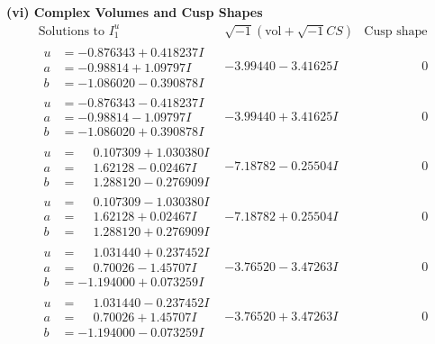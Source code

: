 \documentclass[1p]{elsarticle_modified}
\theoremstyle{definition}
\newcommand{\I}{\sqrt{-1}}
\begin{document}
\newpage\flushleft \textbf{(vi) Complex Volumes and Cusp Shapes}
$$\begin{array}{c|c|c}  
\text{Solutions to }I^u_{1}& \I (\text{vol} + \sqrt{-1}CS) & \text{Cusp shape}\\
 \hline 
\begin{aligned}
u &= -0.876343 + 0.418237 I \\
a &= -0.98814 + 1.09797 I \\
b &= -1.086020 - 0.390878 I\end{aligned}
 & -3.99440 - 3.41625 I & \phantom{-0.000000 } 0 \\ \hline\begin{aligned}
u &= -0.876343 - 0.418237 I \\
a &= -0.98814 - 1.09797 I \\
b &= -1.086020 + 0.390878 I\end{aligned}
 & -3.99440 + 3.41625 I & \phantom{-0.000000 } 0 \\ \hline\begin{aligned}
u &= \phantom{-}0.107309 + 1.030380 I \\
a &= \phantom{-}1.62128 - 0.02467 I \\
b &= \phantom{-}1.288120 - 0.276909 I\end{aligned}
 & -7.18782 - 0.25504 I & \phantom{-0.000000 } 0 \\ \hline\begin{aligned}
u &= \phantom{-}0.107309 - 1.030380 I \\
a &= \phantom{-}1.62128 + 0.02467 I \\
b &= \phantom{-}1.288120 + 0.276909 I\end{aligned}
 & -7.18782 + 0.25504 I & \phantom{-0.000000 } 0 \\ \hline\begin{aligned}
u &= \phantom{-}1.031440 + 0.237452 I \\
a &= \phantom{-}0.70026 - 1.45707 I \\
b &= -1.194000 + 0.073259 I\end{aligned}
 & -3.76520 - 3.47263 I & \phantom{-0.000000 } 0 \\ \hline\begin{aligned}
u &= \phantom{-}1.031440 - 0.237452 I \\
a &= \phantom{-}0.70026 + 1.45707 I \\
b &= -1.194000 - 0.073259 I\end{aligned}
 & -3.76520 + 3.47263 I & \phantom{-0.000000 } 0 \\ \hline\begin{aligned}

\end{aligned}
\end{array}$$
\end{document}
